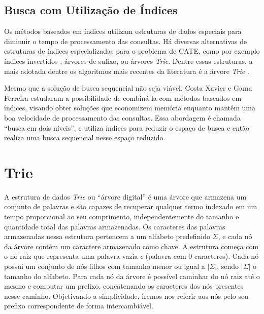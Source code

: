 \subsection{Busca com Utilização de Índices}

Os métodos baseados em índices utilizam estruturas de dados especiais para diminuir o tempo de processamento das consultas. Há diversas alternativas de estruturas de índices especializadas para o problema de CATE, como por exemplo índices invertidos \citep{baezayates99}, árvores de sufixo, ou árvores \textit{Trie}. Dentre essas estruturas, a mais adotada dentre os algoritmos mais recentes da literatura é a árvore \textit{Trie} \citep{chaudhuri2009extending,ji2009efficient,li2011efficient, xiao2013efficient,deng2016meta, zhou2016beva}.

Mesmo que a solução de busca sequencial não seja viável, Costa Xavier e Gama Ferreira \citep{xavier2019, berg2020} estudaram a possibilidade de combiná-la com métodos baseados em índices, visando obter soluções que economizem memória enquanto mantêm uma boa velocidade de processamento das consultas. Essa abordagem é chamada ``busca em dois níveis'', e utiliza índices para reduzir o espaço de busca e então realiza uma busca sequencial nesse espaço reduzido.

\section{Trie}
\label{sec:trie}

A estrutura de dados \textit{Trie} ou ``árvore digital'' é uma árvore que armazena um conjunto de palavras e são capazes de recuperar qualquer termo indexado em um tempo proporcional ao seu comprimento, independentemente do tamanho e quantidade total das palavras armazenadas. Os caracteres das palavras armazenadas nessa estrutura pertencem a um alfabeto predefinido $\Sigma$, e cada nó da árvore contém um caractere armazenado como chave. A estrutura começa com o nó raiz que representa uma palavra vazia $\epsilon$ (palavra com $0$ caracteres). Cada nó possui um conjunto de nós filhos com tamanho menor ou igual a $|\Sigma|$, sendo $|\Sigma|$ o tamanho do alfabeto. Para cada nó da árvore é possível caminhar do nó raiz até o mesmo e computar um prefixo, concatenando os caracteres dos nós presentes nesse caminho. Objetivando a simplicidade, iremos nos referir aos nós pelo seu prefixo correspondente de forma intercambiável.

